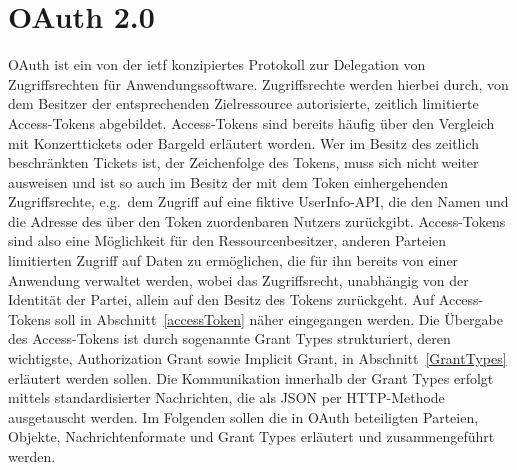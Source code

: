\chapter{OAuth 2.0} \gls{OAuth} ist ein von der \gls{ietf} konzipiertes
Protokoll zur Delegation von Zugriffsrechten für Anwendungssoftware.
Zugriffsrechte werden hierbei durch, von dem Besitzer der entsprechenden
Zielressource autorisierte, zeitlich limitierte Access-Tokens abgebildet.
Access-Tokens sind bereits häufig über den Vergleich mit Konzerttickets oder
Bargeld erläutert worden. Wer im Besitz des zeitlich beschränkten Tickets ist,
der Zeichenfolge des Tokens, muss sich nicht weiter ausweisen und ist so auch im
Besitz der mit dem Token einhergehenden Zugriffsrechte, e.g.\ dem Zugriff auf
eine fiktive UserInfo-API, die den Namen und die Adresse des über den Token
zuordenbaren Nutzers zurückgibt. Access-Tokens sind also eine Möglichkeit für
den Ressourcenbesitzer, anderen Parteien limitierten Zugriff auf Daten zu
ermöglichen, die für ihn bereits von einer Anwendung verwaltet werden, wobei das
Zugriffsrecht, unabhängig von der Identität der Partei, allein auf den Besitz
des Tokens zurückgeht. Auf Access-Tokens soll in Abschnitt~\ref{accessToken}
näher eingegangen werden. Die Übergabe des Access-Tokens ist durch sogenannte
\glspl{Grant Type} strukturiert, deren wichtigste, Authorization Grant sowie
Implicit Grant, in Abschnitt~\ref{GrantTypes} erläutert werden sollen. Die
Kommunikation innerhalb der \glspl{Grant Type} erfolgt mittels standardisierter
Nachrichten, die als JSON per HTTP-Methode ausgetauscht werden. Im Folgenden
sollen die in \gls{OAuth} beteiligten Parteien, Objekte, Nachrichtenformate und
\glspl{Grant Type} erläutert und zusammengeführt werden.





